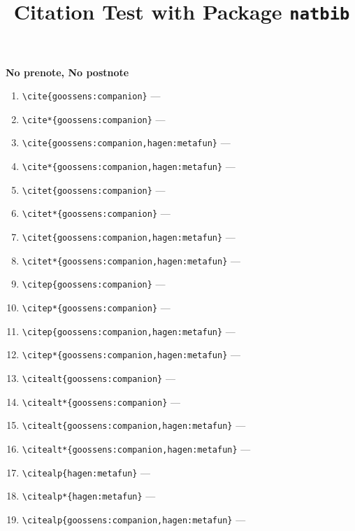 \documentclass[12pt]{article}
\begin{document}
\title{Citation Test with Package \texttt{natbib}}

\textbf{No prenote, No postnote}

\begin{enumerate}
\item
\verb|\cite{goossens:companion}| ---  
\cite{goossens:companion}
\item
\verb|\cite*{goossens:companion}| ---  
\cite*{goossens:companion}
\item
\verb|\cite{goossens:companion,hagen:metafun}| ---  
\cite{goossens:companion,hagen:metafun}
\item
\verb|\cite*{goossens:companion,hagen:metafun}| ---  
\cite*{goossens:companion,hagen:metafun}
\item
\verb|\citet{goossens:companion}| ---  
\citet{goossens:companion}
\item
\verb|\citet*{goossens:companion}| ---  
\citet*{goossens:companion}
\item
\verb|\citet{goossens:companion,hagen:metafun}| ---  
\citet{goossens:companion,hagen:metafun}
\item
\verb|\citet*{goossens:companion,hagen:metafun}| ---  
\citet*{goossens:companion,hagen:metafun}
\item
\verb|\citep{goossens:companion}| ---  
\citep{goossens:companion}
\item
\verb|\citep*{goossens:companion}| ---  
\citep*{goossens:companion}
\item
\verb|\citep{goossens:companion,hagen:metafun}| ---  
\citep{goossens:companion,hagen:metafun}
\item
\verb|\citep*{goossens:companion,hagen:metafun}| ---  
\citep*{goossens:companion,hagen:metafun}
\item
\verb|\citealt{goossens:companion}| ---  
\citealt{goossens:companion}
\item
\verb|\citealt*{goossens:companion}| ---  
\citealt*{goossens:companion}
\item
\verb|\citealt{goossens:companion,hagen:metafun}| ---  
\citealt{goossens:companion,hagen:metafun}
\item
\verb|\citealt*{goossens:companion,hagen:metafun}| ---  
\citealt*{goossens:companion,hagen:metafun}
\item
\verb|\citealp{hagen:metafun}| ---  
\citealp{hagen:metafun}
\item
\verb|\citealp*{hagen:metafun}| ---  
\citealp*{hagen:metafun}
\item
\verb|\citealp{goossens:companion,hagen:metafun}| ---  
\citealp{goossens:companion,hagen:metafun}

\end{enumerate}
\end{document}
